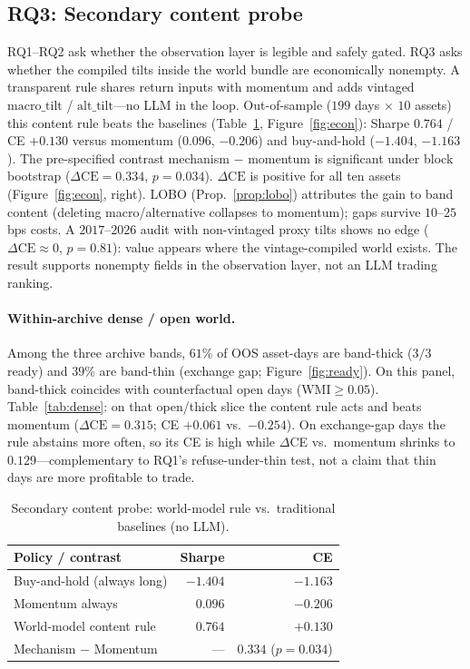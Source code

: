 \documentclass[sigconf,anonymous]{acmart}
\theoremstyle{acmdefinition}%
\theoremstyle{acmplain}%
\begin{document}
\subsection{RQ3: Secondary content probe}
\label{sec:econ}
RQ1--RQ2 ask whether the observation layer is legible and safely gated. RQ3 asks whether the compiled tilts inside the world bundle are economically nonempty. A transparent rule shares return inputs with momentum and adds vintaged \(\mathrm{macro\_tilt}\) / \(\mathrm{alt\_tilt}\)---no LLM in the loop. Out-of-sample (\(199\) days \(\times\) \(10\) assets) this content rule beats the baselines (Table~\ref{tab:econ}, Figure~\ref{fig:econ}): Sharpe \(0.764\) / CE \(+0.130\) versus momentum (\(0.096\), \(-0.206\)) and buy-and-hold (\(-1.404\), \(-1.163\)). The pre-specified contrast mechanism $-$ momentum is significant under block bootstrap (\(\Delta\mathrm{CE}{=}0.334\), \(p{=}0.034\)). \(\Delta\mathrm{CE}\) is positive for all ten assets (Figure~\ref{fig:econ}, right). LOBO (Prop.~\ref{prop:lobo}) attributes the gain to band content (deleting macro/alternative collapses to momentum); gaps survive \(10\)--\(25\)bps costs. A \(2017\)--\(2026\) audit with non-vintaged proxy tilts shows no edge (\(\Delta\mathrm{CE}\approx 0\), \(p{=}0.81\)): value appears where the vintage-compiled world exists. The result supports nonempty fields in the observation layer, not an LLM trading ranking.

\paragraph{Within-archive dense / open world.}
Among the three archive bands, \(61\%\) of OOS asset-days are band-thick (\(3/3\) ready) and \(39\%\) are band-thin (exchange gap; Figure~\ref{fig:ready}). On this panel, band-thick coincides with counterfactual open days (\(\mathrm{WMI}\ge 0.05\)). Table~\ref{tab:dense}: on that open/thick slice the content rule acts and beats momentum (\(\Delta\mathrm{CE}{=}0.315\); CE \(+0.061\) vs.\ \(-0.254\)). On exchange-gap days the rule abstains more often, so its CE is high while \(\Delta\)CE vs.\ momentum shrinks to \(0.129\)---complementary to RQ1's refuse-under-thin test, not a claim that thin days are more profitable to trade.

\begin{table}[t]
  \caption{Secondary content probe: world-model rule vs.\ traditional baselines (no LLM).}
  \label{tab:econ}
  \begin{tabular}{lrr}
    \toprule
    Policy / contrast & Sharpe & CE \\
    \midrule
    Buy-and-hold (always long) & $-1.404$ & $-1.163$ \\
    Momentum always & $0.096$ & $-0.206$ \\
    World-model content rule & $\mathbf{0.764}$ & $\mathbf{+0.130}$ \\
    Mechanism $-$ Momentum & --- & $0.334$ ($p{=}0.034$) \\
    \bottomrule
  \end{tabular}
\end{table}
\end{document}
